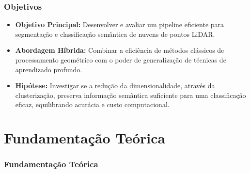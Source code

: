 \documentclass[aspectratio=169,t,xcolor=table]{beamer}
\begin{document}
\begin{frame}
    \frametitle{Objetivos}
    \begin{itemize}
        \item<+-> \textbf{Objetivo Principal:} Desenvolver e avaliar um pipeline eficiente para segmentação e classificação semântica de nuvens de pontos LiDAR.
        \item<+-> \textbf{Abordagem Híbrida:} Combinar a eficiência de métodos clássicos de processamento geométrico com o poder de generalização de técnicas de aprendizado profundo.
        \item<+-> \textbf{Hipótese:} Investigar se a redução da dimensionalidade, através da clusterização, preserva informação semântica suficiente para uma classificação eficaz, equilibrando acurácia e custo computacional.
    \end{itemize}
\end{frame}

\section{Fundamentação Teórica}

\begin{frame}
    \frametitle{Fundamentação Teórica}
\end{frame}
\end{document}
